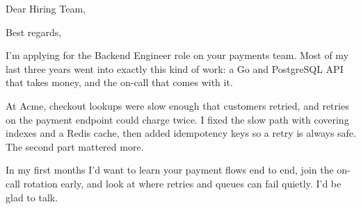 \documentclass[11pt,a4paper,sans]{moderncv}
\begin{document}
\date{\today}
\opening{Dear Hiring Team,}
\closing{Best regards,}
\makelettertitle

I'm applying for the Backend Engineer role on your payments team. Most of my last three years went into exactly this kind of work: a Go and PostgreSQL API that takes money, and the on-call that comes with it.

At Acme, checkout lookups were slow enough that customers retried, and retries on the payment endpoint could charge twice. I fixed the slow path with covering indexes and a Redis cache, then added idempotency keys so a retry is always safe. The second part mattered more.

In my first months I'd want to learn your payment flows end to end, join the on-call rotation early, and look at where retries and queues can fail quietly. I'd be glad to talk.

\makeletterclosing
\end{document}
